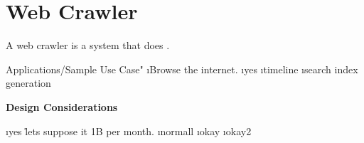 
\chapter{Web Crawler}

A web crawler is a system that does \lipsum[1].


Applications/Sample Use Case"
\lstart
    \i Browse the internet.
    \i yes
    \i timeline
    \i search index generation
\lend

\textbf{Design Considerations}
\begin{compactenum}
    \i yes \r{lets suppose it 1B per month.}
    \i normall
    \i okay
    \i okay2 
\end{compactenum}